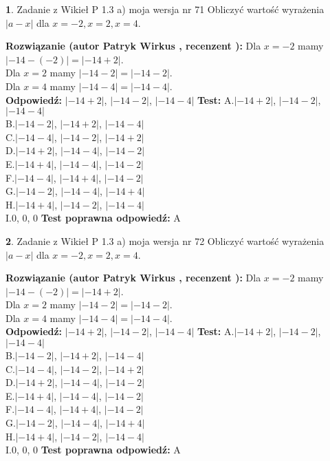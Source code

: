 \documentclass[12pt, a4paper]{article}
\theoremstyle{definition} %
\newtheorem{zad}{}
\newcommand{\zadStart}[1]{\begin{zad}#1\newline}
\newcommand{\zadStop}{\end{zad}}
\newcommand{\rozwStart}[2]{\noindent \textbf{Rozwiązanie (autor #1 , recenzent #2): }\newline}
\newcommand{\rozwStop}{\newline}
\newcommand{\odpStart}{\noindent \textbf{Odpowiedź:}\newline}
\newcommand{\odpStop}{\newline}
\newcommand{\testStart}{\noindent \textbf{Test:}\newline}
\newcommand{\testStop}{\newline}
\newcommand{\kluczStart}{\noindent \textbf{Test poprawna odpowiedź:}\newline}
\newcommand{\kluczStop}{\newline}
\begin{document}
\zadStart{Zadanie z Wikieł P 1.3 a) moja wersja nr 71}
Obliczyć wartość wyrażenia $|a - x|$ dla $x=-2,x=2,x=4$.
\zadStop
\rozwStart{Patryk Wirkus}{}
Dla $x = -2$ mamy $|-14 - (-2)| = |-14 + 2|$.\\
Dla $x = 2$ mamy $|-14 - 2| = |-14 - 2|$.\\
Dla $x = 4$ mamy $|-14 - 4| = |-14 - 4|$.\\
\rozwStop
\odpStart
$|-14 + 2|$, $|-14 - 2|$, $|-14 - 4|$
\odpStop
\testStart
A.$|-14 + 2|$, $|-14 - 2|$, $|-14 - 4|$\\
B.$|-14 - 2|$, $|-14 + 2|$, $|-14 - 4|$\\
C.$|-14 - 4|$, $|-14 - 2|$, $|-14 + 2|$\\
D.$|-14 + 2|$, $|-14 - 4|$, $|-14 - 2|$\\
E.$|-14 + 4|$, $|-14 - 4|$, $|-14 - 2|$\\
F.$|-14 - 4|$, $|-14 + 4|$, $|-14 - 2|$\\
G.$|-14 - 2|$, $|-14 - 4|$, $|-14 + 4|$\\
H.$|-14 + 4|$, $|-14 - 2|$, $|-14 - 4|$\\
I.$0$, $0$, $0$
\testStop
\kluczStart
A
\kluczStop



\zadStart{Zadanie z Wikieł P 1.3 a) moja wersja nr 72}
Obliczyć wartość wyrażenia $|a - x|$ dla $x=-2,x=2,x=4$.
\zadStop
\rozwStart{Patryk Wirkus}{}
Dla $x = -2$ mamy $|-14 - (-2)| = |-14 + 2|$.\\
Dla $x = 2$ mamy $|-14 - 2| = |-14 - 2|$.\\
Dla $x = 4$ mamy $|-14 - 4| = |-14 - 4|$.\\
\rozwStop
\odpStart
$|-14 + 2|$, $|-14 - 2|$, $|-14 - 4|$
\odpStop
\testStart
A.$|-14 + 2|$, $|-14 - 2|$, $|-14 - 4|$\\
B.$|-14 - 2|$, $|-14 + 2|$, $|-14 - 4|$\\
C.$|-14 - 4|$, $|-14 - 2|$, $|-14 + 2|$\\
D.$|-14 + 2|$, $|-14 - 4|$, $|-14 - 2|$\\
E.$|-14 + 4|$, $|-14 - 4|$, $|-14 - 2|$\\
F.$|-14 - 4|$, $|-14 + 4|$, $|-14 - 2|$\\
G.$|-14 - 2|$, $|-14 - 4|$, $|-14 + 4|$\\
H.$|-14 + 4|$, $|-14 - 2|$, $|-14 - 4|$\\
I.$0$, $0$, $0$
\testStop
\kluczStart
A
\kluczStop
\end{document}
